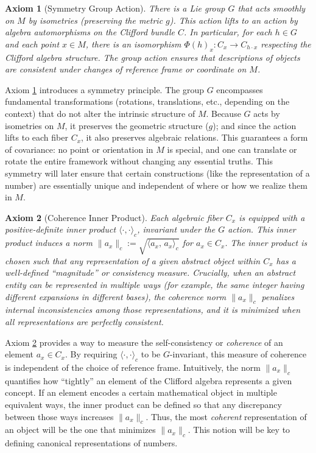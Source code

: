 \documentclass[11pt]{article}
\newtheorem{axiom}{Axiom}
\begin{document}
\begin{axiom}[Symmetry Group Action]\label{ax:symmetry}
There is a Lie group $G$ that acts smoothly on $M$ by isometries (preserving the metric $g$). This action lifts to an action by algebra automorphisms on the Clifford bundle $C$. In particular, for each $h \in G$ and each point $x \in M$, there is an isomorphism $\Phi(h)_x: C_x \to C_{h\cdot x}$ respecting the Clifford algebra structure. The group action ensures that descriptions of objects are consistent under changes of reference frame or coordinate on $M$.
\end{axiom}

Axiom \ref{ax:symmetry} introduces a symmetry principle. The group $G$ encompasses fundamental transformations (rotations, translations, etc., depending on the context) that do not alter the intrinsic structure of $M$. Because $G$ acts by isometries on $M$, it preserves the geometric structure ($g$); and since the action lifts to each fiber $C_x$, it also preserves algebraic relations. This guarantees a form of covariance: no point or orientation in $M$ is special, and one can translate or rotate the entire framework without changing any essential truths. This symmetry will later ensure that certain constructions (like the representation of a number) are essentially unique and independent of where or how we realize them in $M$.

\begin{axiom}[Coherence Inner Product]\label{ax:coherence}
Each algebraic fiber $C_x$ is equipped with a positive-definite inner product $\langle\cdot,\cdot\rangle_c$, invariant under the $G$ action. This inner product induces a norm $\|a_x\|_c := \sqrt{\langle a_x,\,a_x\rangle_c}$ for $a_x \in C_x$. The inner product is chosen such that any representation of a given abstract object within $C_x$ has a well-defined “magnitude” or consistency measure. Crucially, when an abstract entity can be represented in multiple ways (for example, the same integer having different expansions in different bases), the \emph{coherence norm} $\|a_x\|_c$ penalizes internal inconsistencies among those representations, and it is minimized when all representations are perfectly consistent.
\end{axiom}

Axiom \ref{ax:coherence} provides a way to measure the self-consistency or \emph{coherence} of an element $a_x \in C_x$. By requiring $\langle\cdot,\cdot\rangle_c$ to be $G$-invariant, this measure of coherence is independent of the choice of reference frame. Intuitively, the norm $\|a_x\|_c$ quantifies how “tightly” an element of the Clifford algebra represents a given concept. If an element encodes a certain mathematical object in multiple equivalent ways, the inner product can be defined so that any discrepancy between those ways increases $\|a_x\|_c$. Thus, the most \emph{coherent} representation of an object will be the one that minimizes $\|a_x\|_c$. This notion will be key to defining canonical representations of numbers.
\end{document}
